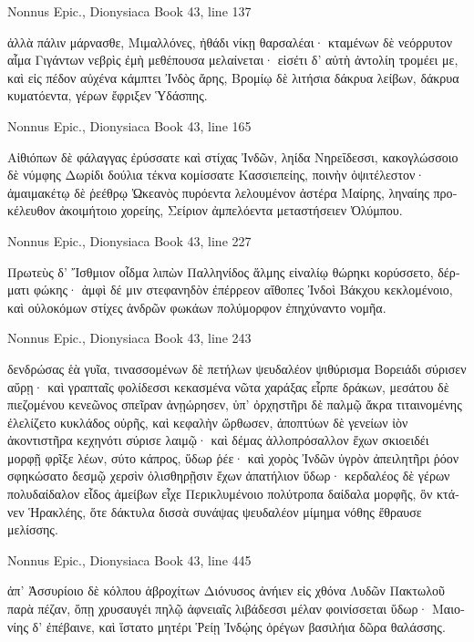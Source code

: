 \documentclass[12pt,letterpaper,twoside,final]{memoir}
\begin{document}
\begin{greek}
Nonnus Epic., Dionysiaca 
Book 43, line 137

ἀλλὰ πάλιν μάρνασθε, Μιμαλλόνες, ἠθάδι νίκῃ 
θαρσαλέαι· κταμένων δὲ νεόρρυτον αἷμα Γιγάντων 
νεβρὶς ἐμὴ μεθέπουσα μελαίνεται· εἰσέτι δ' αὐτὴ 
ἀντολίη τρομέει με, καὶ εἰς πέδον αὐχένα κάμπτει 
Ἰνδὸς ἄρης, Βρομίῳ δὲ λιτήσια δάκρυα λείβων, 
δάκρυα κυματόεντα, γέρων ἔφριξεν Ὑδάσπης. 



Nonnus Epic., Dionysiaca 
Book 43, line 165

Αἰθιόπων δὲ φάλαγγας ἐρύσσατε καὶ στίχας Ἰνδῶν, 
ληίδα Νηρεΐδεσσι, κακογλώσσοιο δὲ νύμφης 
Δωρίδι δούλια τέκνα κομίσσατε Κασσιεπείης, 
ποινὴν ὀψιτέλεστον· ἀμαιμακέτῳ δὲ ῥεέθρῳ 
Ὠκεανὸς πυρόεντα λελουμένον ἀστέρα Μαίρης, 
ληναίης προκέλευθον ἀκοιμήτοιο χορείης, 
Σείριον ἀμπελόεντα μεταστήσειεν Ὀλύμπου. 



Nonnus Epic., Dionysiaca 
Book 43, line 227

Πρωτεὺς δ' Ἴσθμιον οἶδμα λιπὼν Παλληνίδος ἅλμης 
εἰναλίῳ θώρηκι κορύσσετο, δέρματι φώκης· 
ἀμφὶ δέ μιν στεφανηδὸν ἐπέρρεον αἴθοπες Ἰνδοὶ 
Βάκχου κεκλομένοιο, καὶ οὐλοκόμων στίχες ἀνδρῶν 
φωκάων πολύμορφον ἐπηχύναντο νομῆα. 



Nonnus Epic., Dionysiaca 
Book 43, line 243

δενδρώσας ἑὰ γυῖα, τινασσομένων δὲ πετήλων 
ψευδαλέον ψιθύρισμα Βορειάδι σύρισεν αὔρῃ· 
καὶ γραπταῖς φολίδεσσι κεκασμένα νῶτα χαράξας 
εἷρπε δράκων, μεσάτου δὲ πιεζομένου κενεῶνος 
σπεῖραν ἀνῃώρησεν, ὑπ' ὀρχηστῆρι δὲ παλμῷ 
ἄκρα τιταινομένης ἐλελίζετο κυκλάδος οὐρῆς, 
καὶ κεφαλὴν ὤρθωσεν, ἀποπτύων δὲ γενείων 
ἰὸν ἀκοντιστῆρα κεχηνότι σύρισε λαιμῷ· 
καὶ δέμας ἀλλοπρόσαλλον ἔχων σκιοειδέι μορφῇ 
φρῖξε λέων, σύτο κάπρος, ὕδωρ ῥέε· καὶ χορὸς Ἰνδῶν 
ὑγρὸν ἀπειλητῆρι ῥόον σφηκώσατο δεσμῷ 
χερσὶν ὀλισθηρῇσιν ἔχων ἀπατήλιον ὕδωρ· 
κερδαλέος δὲ γέρων πολυδαίδαλον εἶδος ἀμείβων   
εἶχε Περικλυμένοιο πολύτροπα δαίδαλα μορφῆς, 
ὃν κτάνεν Ἡρακλέης, ὅτε δάκτυλα δισσὰ συνάψας 
ψευδαλέον μίμημα νόθης ἔθραυσε μελίσσης. 



Nonnus Epic., Dionysiaca 
Book 43, line 445

                                 ἀπ' Ἀσσυρίοιο δὲ κόλπου 
ἁβροχίτων Διόνυσος ἀνήιεν εἰς χθόνα Λυδῶν 
Πακτωλοῦ παρὰ πέζαν, ὅπῃ χρυσαυγέι πηλῷ   
ἀφνειαῖς λιβάδεσσι μέλαν φοινίσσεται ὕδωρ· 
Μαιονίης δ' ἐπέβαινε, καὶ ἵστατο μητέρι Ῥείῃ 
Ἰνδῴης ὀρέγων βασιλήια δῶρα θαλάσσης. 




\end{greek}
\end{document}
